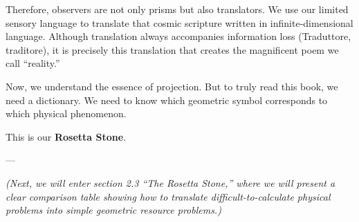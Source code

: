 Therefore, observers are not only prisms but also translators. We use our limited sensory language to translate that cosmic scripture written in infinite-dimensional language. Although translation always accompanies information loss (Traduttore, traditore), it is precisely this translation that creates the magnificent poem we call ``reality.''

Now, we understand the essence of projection. But to truly read this book, we need a dictionary. We need to know which geometric symbol corresponds to which physical phenomenon.

This is our \textbf{Rosetta Stone}.

---

\textit{(Next, we will enter section 2.3 ``The Rosetta Stone,'' where we will present a clear comparison table showing how to translate difficult-to-calculate physical problems into simple geometric resource problems.)}

